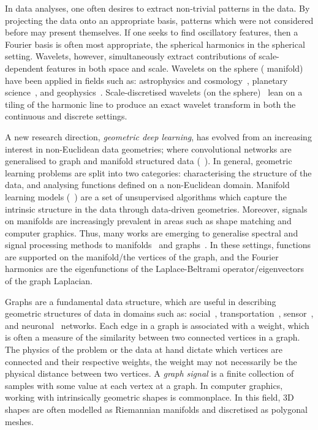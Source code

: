In data analyses, one often desires to extract non-trivial patterns in the data.
By projecting the data onto an appropriate basis, patterns which were not considered before may present themselves.
If one seeks to find oscillatory features, then a Fourier basis is often most appropriate, \ie{} the spherical harmonics in the spherical setting.
Wavelets, however, simultaneously extract contributions of scale-dependent features in both space and scale.
Wavelets on the sphere (\cf{} manifold) have been applied in fields such as: astrophysics and cosmology~\cite{Pen1999,Barreiro2001,Rocha2004,McEwen2004}, planetary science~\cite{Audet2011,Audet2014}, and geophysics~\cite{Loris2010,Simons2011,Simons2011b}.
Scale-discretised wavelets (on the sphere)~\cite{Wiaux2008,McEwen2018,Leistedt2013,McEwen2013,McEwen2015} lean on a tiling of the harmonic line to produce an exact wavelet transform in both the continuous and discrete settings.

A new research direction, \emph{geometric deep learning}, has evolved from an increasing interest in non-Euclidean data geometries; where convolutional networks are generalised to graph and manifold structured data (\eg{}~\cite{Bronstein2017,Perlmutter2020}).
In general, geometric learning problems are split into two categories: characterising the structure of the data, and analysing functions defined on a non-Euclidean domain.
Manifold learning models (\eg{}~\cite{Tenenbaum2000,Coifman2006b,VanDerMaaten2008}) are a set of unsupervised algorithms which capture the intrinsic structure in the data through data-driven geometries.
Moreover, signals on manifolds are increasingly prevalent in areas such as shape matching and computer graphics.
Thus, many works are emerging to generalise spectral and signal processing methods to manifolds~\cite{Coifman2006} and graphs~\cite{Shuman2013}.
In these settings, functions are supported on the manifold/the vertices of the graph, and the Fourier harmonics are the eigenfunctions of the Laplace-Beltrami operator/eigenvectors of the graph Laplacian.

Graphs are a fundamental data structure, which are useful in describing geometric structures of data in domains such as: social~\cite{Nettleton2013}, transportation~\cite{Mohan2014}, sensor~\cite{Kenniche2010}, and neuronal~\cite{Tang2012} networks.
Each edge in a graph is associated with a weight, which is often a measure of the similarity between two connected vertices in a graph.
The physics of the problem or the data at hand dictate which vertices are connected and their respective weights, \ie{} the weight may not necessarily be the physical distance between two vertices.
A \emph{graph signal} is a finite collection of samples with some value at each vertex at a graph.
In computer graphics, working with intrinsically geometric shapes is commonplace.
In this field, 3D shapes are often modelled as Riemannian manifolds and discretised as polygonal meshes.

